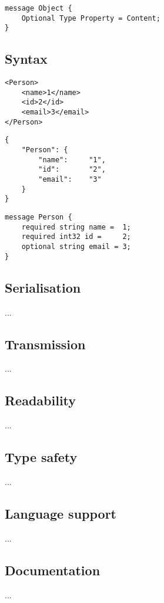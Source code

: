 \documentclass[../report.tex]{subfiles}
\begin{document}
\vspace{1mm}

\begin{Verbatim}[frame=single,numbers=right,framesep=5mm,label=Proto Object]
message Object {
    Optional Type Property = Content;
}
\end{Verbatim}

\subsection{Syntax}

\begin{Verbatim}[frame=single,numbers=right,framesep=5mm,label=XML Object]
<Person>
    <name>1</name>
    <id>2</id>
    <email>3</email>
</Person>
\end{Verbatim}

\vspace{1mm}

\begin{Verbatim}[frame=single,numbers=right,framesep=5mm,label=JSON Object]
{
    "Person": {
        "name":     "1",
        "id":       "2",
        "email":    "3"
    }
}
\end{Verbatim}

\vspace{1mm}

\begin{Verbatim}[frame=single,numbers=right,framesep=5mm,label=Proto Object]
message Person {
    required string name =  1;
    required int32 id =     2;
    optional string email = 3;
}
\end{Verbatim}

\subsection{Serialisation}

...

\subsection{Transmission}

...

\subsection{Readability}

...

\subsection{Type safety}

...

\subsection{Language support}

...

\subsection{Documentation}

...
\end{document}
